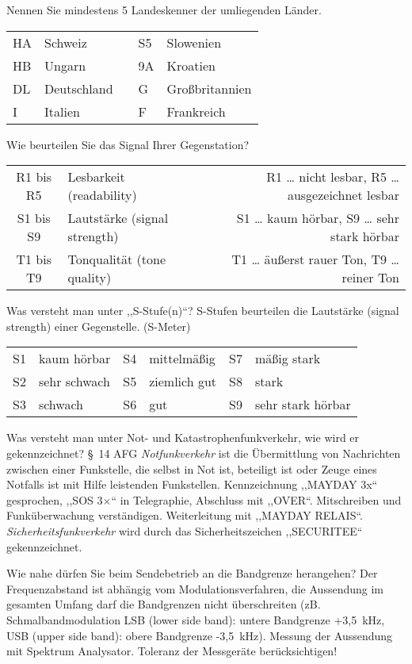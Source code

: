\documentclass[avery5371,grid,frame,a4paper]{flashcards}
\newcommand{\card}[3]{
  \begin{flashcard}[{\chap} -- #1]{#2}#3\end{flashcard}
}
\begin{document}
\card{05}{Nennen Sie mindestens 5 Landeskenner der umliegenden Länder.}{
  \begin{tabular}{llcll}
    HA & Schweiz     & & S5 & Slowenien \\
    HB & Ungarn      & & 9A & Kroatien \\
    DL & Deutschland & & G  & Großbritannien \\
    I  & Italien     & & F  & Frankreich
  \end{tabular}
}
\card{06}{Wie beurteilen Sie das Signal Ihrer Gegenstation?}{
  \begin{tabular}{clr}
    R1 bis R5 & Lesbarkeit (readability)         & R1 \dots{} nicht lesbar, R5 \dots{} ausgezeichnet lesbar \\
    S1 bis S9 & Lautstärke (signal strength)     & S1 \dots{} kaum hörbar, S9 \dots{} sehr stark hörbar \\
    T1 bis T9 & Tonqualität (tone quality)       & T1 \dots{} äußerst rauer Ton, T9 \dots{} reiner Ton
  \end{tabular}
}
\card{07}{Was versteht man unter ,,S-Stufe(n)``?}{
  S-Stufen beurteilen die Lautstärke (signal strength) einer Gegenstelle. (S-Meter)

  \begin{tabular}{clclcl}
    S1 & kaum hörbar    & S4 & mittelmäßig    & S7 & mäßig stark  \\
    S2 & sehr schwach   & S5 & ziemlich gut   & S8 & stark \\
    S3 & schwach        & S6 & gut            & S9 & sehr stark hörbar
  \end{tabular}
}
\card{08}{Was versteht man unter Not- und Katastrophenfunkverkehr, wie wird er gekennzeichnet?}{
  §~14 AFG \emph{Notfunkverkehr} ist die Übermittlung von Nachrichten zwischen einer Funkstelle, die selbst in Not ist, beteiligt ist oder Zeuge eines Notfalls ist mit Hilfe leistenden Funkstellen. Kennzeichnung ,,MAYDAY 3x`` gesprochen, ,,SOS 3$\times$`` in Telegraphie, Abschluss mit ,,OVER``. Mitschreiben und Funküberwachung verständigen. Weiterleitung mit ,,MAYDAY RELAIS``. \emph{Sicherheitsfunkverkehr} wird durch das Sicherheitszeichen ,,SECURITEE`` gekennzeichnet.
}
\card{09}{Wie nahe dürfen Sie beim Sendebetrieb an die Bandgrenze herangehen?}{
  Der Frequenzabstand ist abhängig vom Modulationsverfahren, die Aussendung im gesamten Umfang darf die Bandgrenzen nicht überschreiten (zB. Schmalbandmodulation LSB (lower side band): untere  Bandgrenze +3,5~kHz, USB (upper side band): obere Bandgrenze -3,5~kHz). Messung der Aussendung mit Spektrum Analysator. Toleranz der Messgeräte berücksichtigen!
}
\end{document}
